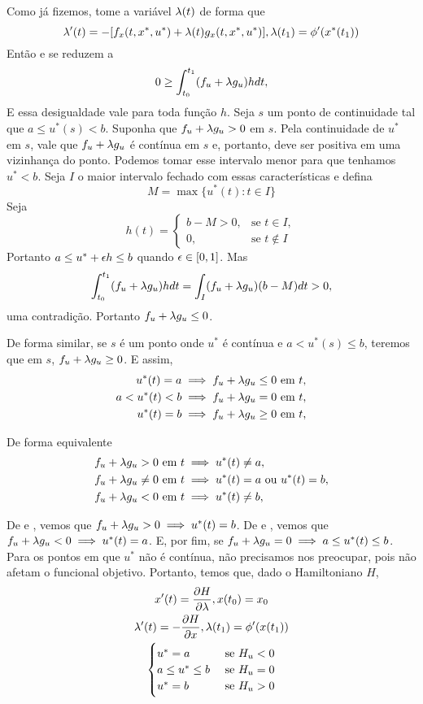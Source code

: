 Como já fizemos, tome a variável $\lambda(t)$ de forma que 
$$
\lambda '(t) = -[f_x(t,x^*, u^*) + \lambda(t)g_x(t,x^*,u^*)], \lambda(t_1) = \phi '(x^*(t_1))
$$
Então  e  se reduzem a 
$$
0 \ge \int_{t_0}^{t_1} (f_u + \lambda g_u)h dt,
$$
E essa desigualdade vale para toda função $h$. Seja $s$ um ponto de
continuidade tal que $a \le u^*(s) < b$. Suponha que $f_u + \lambda g_u > 0$ em
$s$. Pela continuidade de $u^*$ em $s$, vale que $f_u + \lambda g_u$ é contínua em
$s$ e, portanto, deve ser positiva em uma vizinhança do ponto. Podemos tomar esse
intervalo menor para que tenhamos $u^* < b$. Seja $I$ o maior intervalo
fechado com essas características e defina  
$$
M = \max\{u^*(t): t \in I\}
$$
Seja 
$$
h(t) = \begin{cases}
    b - M > 0, &\text{se }t \in I, \\
    0,     &\text{se }t \not\in I
\end{cases}
$$
Portanto $a \le u^* + \epsilon h \le b$ quando $\epsilon \in [0,1]$. Mas
$$
\int_{t_0}^{t_1} (f_u + \lambda g_u)h dt = \int_I (f_u + \lambda g_u)(b-M) dt > 0,
$$
uma contradição. Portanto $f_u + \lambda g_u \le 0$. 

De forma similar, se $s$ é um ponto onde $u^*$ é contínua e $a < u^*(s) \le
b$, teremos que em $s$, $f_u + \lambda g_u \ge 0$. E assim, 
\begin{align*}
    u^*(t) = a &\implies f_u + \lambda g_u \le 0 \text{ em } t, \\
    a < u^*(t) < b &\implies f_u + \lambda g_u = 0 \text{ em } t, \\
    u^*(t) = b &\implies f_u + \lambda g_u \ge 0 \text{ em } t, 
\end{align*}

De forma equivalente 
\begin{align}
    \label{eq:8-3}
    f_u + \lambda g_u > 0 \text{ em } t &\implies u^*(t) \neq a , \\
    \label{eq:8-4}
    f_u + \lambda g_u \neq 0 \text{ em } t  &\implies u^*(t)=a \text{ ou } u^*(t)=b, \\
    \label{eq:8-5}
    f_u + \lambda g_u < 0 \text{ em } t &\implies u^*(t) \neq b, 
\end{align}

De  e , vemos que $f_u + \lambda g_u > 0 \implies
u^*(t) = b$. De  e , vemos que $f_u + \lambda g_u < 0
\implies u^*(t) = a$. E, por fim, se $f_u + \lambda g_u = 0 \implies a \le u^*(t)
\le b$. Para os pontos em que $u^*$ não é contínua, não precisamos nos
preocupar, pois não afetam o funcional objetivo. Portanto, temos que, dado o
Hamiltoniano $H$, 
\begin{gather*}
    x'(t) = \frac{\partial H}{\partial \lambda}, x(t_0) = x_0 \\ 
    \lambda '(t) = - \frac{\partial H}{\partial x}, \lambda(t_1) = \phi '(x(t_1)) \\
    \begin{cases}
        u^* = a &\text{ se } H_u < 0 \\
        a \le u^* \le b &\text{ se } H_u = 0 \\
        u^* = b &\text{ se } H_u > 0 \\
    \end{cases}
\end{gather*}

